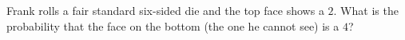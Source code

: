Frank rolls a fair standard six-sided die and the top face shows a $2$. What is the probability that the face on the bottom (the one he cannot see) is a $4$?
